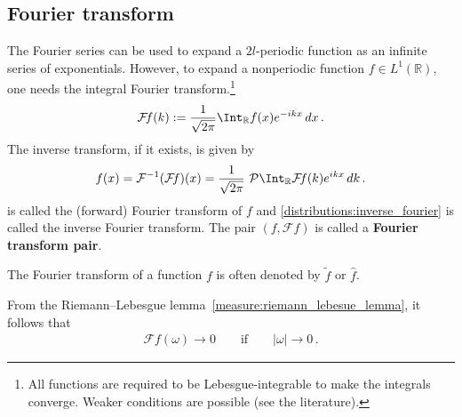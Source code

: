 \subsection{Fourier transform}\label{section:fourier_transform}

    The Fourier series can be used to expand a $2l$-periodic function as an infinite series of exponentials. However, to expand a nonperiodic function $f\in L^1(\mathbb{R})$, one needs the integral Fourier transform.\footnote{All functions are required to be Lebesgue-integrable to make the integrals converge. Weaker conditions are possible (see the literature).}
    \begin{gather}
        \label{distributions:fourier}
        \mathcal{F}\!f(k) := \frac{1}{\sqrt{2\pi}}\Int_{\mathbb{R}}f(x)e^{-ikx}\,dx\,.
    \end{gather}
    The inverse transform, if it exists, is given by
    \begin{gather}
        \label{distributions:inverse_fourier}
        f(x) = \mathcal{F}^{-1}(\mathcal{F}\!f)(x) = \frac{1}{\sqrt{2\pi}}\ \mathcal{P}\Int_{\mathbb{R}}\mathcal{F}\!f(k)e^{ikx}\,dk\,.
    \end{gather}
     is called the (forward) Fourier transform of $f$ and \cref{distributions:inverse_fourier} is called the inverse Fourier transform. The pair $(f,\mathcal{F}\!f)$ is called a \textbf{Fourier transform pair}.
    \begin{notation}
        The Fourier transform of a function $f$ is often denoted by $\widetilde{f}$ or $\widehat{f}$.
    \end{notation}

    \begin{property}
        From the Riemann--Lebesgue lemma~\ref{measure:riemann_lebesue_lemma}, it follows that
        \begin{gather}
            \mathcal{F}\!f(\omega)\longrightarrow0\qquad\text{if}\qquad |\omega|\longrightarrow0\,.
        \end{gather}
    \end{property}

